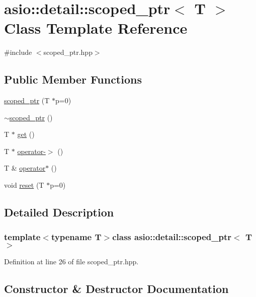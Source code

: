 \hypertarget{classasio_1_1detail_1_1scoped__ptr}{}\section{asio\+:\+:detail\+:\+:scoped\+\_\+ptr$<$ T $>$ Class Template Reference}
\label{classasio_1_1detail_1_1scoped__ptr}


{\ttfamily \#include $<$scoped\+\_\+ptr.\+hpp$>$}

\subsection*{Public Member Functions}
\begin{DoxyCompactItemize}
\item 
\hyperlink{classasio_1_1detail_1_1scoped__ptr_ac296cd97c188e637d6a4343c00c7bc02}{scoped\+\_\+ptr} (T $\ast$p=0)
\item 
\hyperlink{classasio_1_1detail_1_1scoped__ptr_a362b8123d0eb893a7214f67b469a244d}{$\sim$scoped\+\_\+ptr} ()
\item 
T $\ast$ \hyperlink{classasio_1_1detail_1_1scoped__ptr_a11a649c902e6c1cbbd826946f16a280a}{get} ()
\item 
T $\ast$ \hyperlink{classasio_1_1detail_1_1scoped__ptr_a8c28ca9ba1cbcb66b24c9448042731be}{operator-\/$>$} ()
\item 
T \& \hyperlink{classasio_1_1detail_1_1scoped__ptr_ab45eac24352e57daee96d60ee77262d1}{operator$\ast$} ()
\item 
void \hyperlink{classasio_1_1detail_1_1scoped__ptr_a24acf1ea6d44cd9a4aaf2785e513b1e8}{reset} (T $\ast$p=0)
\end{DoxyCompactItemize}


\subsection{Detailed Description}
\subsubsection*{template$<$typename T$>$class asio\+::detail\+::scoped\+\_\+ptr$<$ T $>$}



Definition at line 26 of file scoped\+\_\+ptr.\+hpp.



\subsection{Constructor \& Destructor Documentation}
\hypertarget{classasio_1_1detail_1_1scoped__ptr_ac296cd97c188e637d6a4343c00c7bc02}{}
